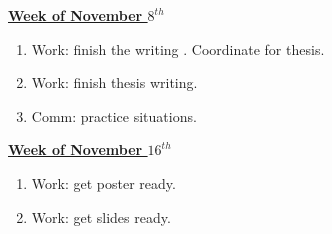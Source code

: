 \documentclass[serif, mathserif, final]{beamer}
\begin{document}
{\begin{frame} {}
\begin{columns}
\begin{column}{0.27\linewidth}
\begin{block}{\small \underline{\textbf{Week of November $8^{th}$}}}
\begin{enumerate}
\tiny \item \tiny Work: finish the writing . Coordinate for thesis. 
\item \tiny  Work: finish thesis writing. 
\item \tiny  Comm: practice situations.
\end{enumerate}
\end{block}

\begin{block} {\small \underline{\textbf{Week of November $16^{th}$}} }
\begin{enumerate}
\tiny \item \tiny Work: get poster ready. 
\item \tiny Work: get slides ready.
\end{enumerate}
\end{block} 

\end{column}%
 \end{columns} 
\end{frame} 
}
\end{document}
